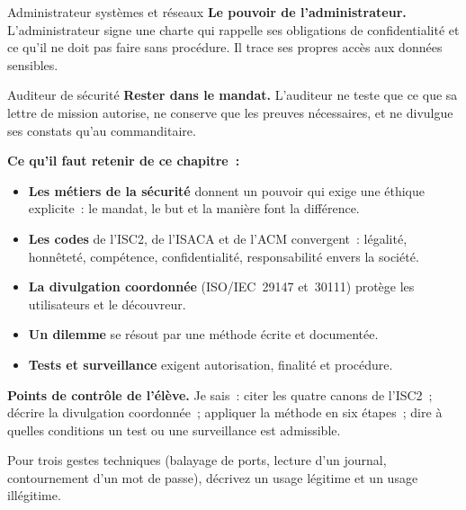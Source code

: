 \begin{boxmetier}{Administrateur systèmes et réseaux}
\textbf{Le pouvoir de l'administrateur.} L'administrateur signe une charte
qui rappelle ses obligations de confidentialité et ce qu'il ne doit pas
faire sans procédure. Il trace ses propres accès aux données sensibles.
\end{boxmetier}

\begin{boxmetier}{Auditeur de sécurité}
\textbf{Rester dans le mandat.} L'auditeur ne teste que ce que sa lettre
de mission autorise, ne conserve que les preuves nécessaires, et ne
divulgue ses constats qu'au commanditaire.
\end{boxmetier}

\separateur

\begin{boxresume}
\textbf{Ce qu'il faut retenir de ce chapitre~:}
\begin{itemize}
    \item \textbf{Les métiers de la sécurité} donnent un pouvoir qui exige
          une éthique explicite~: le mandat, le but et la manière font la
          différence.
    \item \textbf{Les codes} de l'ISC2, de l'ISACA et de l'ACM convergent~:
          légalité, honnêteté, compétence, confidentialité, responsabilité
          envers la société.
    \item \textbf{La divulgation coordonnée} (ISO/IEC~29147 et~30111)
          protège les utilisateurs et le découvreur.
    \item \textbf{Un dilemme} se résout par une méthode écrite et
          documentée.
    \item \textbf{Tests et surveillance} exigent autorisation, finalité et
          procédure.
\end{itemize}
\end{boxresume}

\begin{boxinfo}
\textbf{Points de contrôle de l'élève.} Je sais~: citer les quatre canons
de l'ISC2~; décrire la divulgation coordonnée~; appliquer la méthode en
six étapes~; dire à quelles conditions un test ou une surveillance est
admissible.
\end{boxinfo}

\bigskip

\begin{boxexo}[title={\ding{45}\quad Exercice~12.1. Le même geste \niveaubase}]
Pour trois gestes techniques (balayage de ports, lecture d'un journal,
contournement d'un mot de passe), décrivez un usage légitime et un usage
illégitime.
\end{boxexo}


